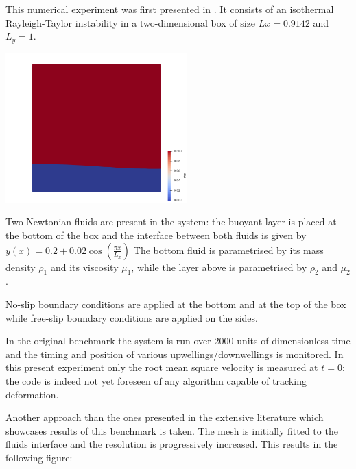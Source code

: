This numerical experiment was first presented in \cite{vkks97}.
It consists of an isothermal Rayleigh-Taylor instability in a two-dimensional box
of size $Lx=0.9142$ and $L_y=1$.

\begin{center}
\includegraphics[width=7cm]{python_codes/fieldstone_RTinstability1/images/setup}
\end{center}

Two Newtonian fluids are present in the system: the buoyant layer is placed at the bottom of 
the box and the interface between both fluids is given by 
$
y(x)=0.2+0.02\cos \left( \frac{\pi x}{L_x}  \right)
$
The bottom fluid is parametrised by its mass density $\rho_1$ and its viscosity $\mu_1$, 
while the layer above is parametrised by $\rho_2$ and $\mu_2$.

No-slip boundary conditions are applied at the bottom and at the top of the box 
while free-slip boundary conditions are applied on the sides. 

In the original benchmark the system is run over 2000 units of dimensionless time and the 
timing and position of various upwellings/downwellings is monitored. 
In this present experiment only the root mean square velocity is measured at $t=0$:
the code is indeed not yet foreseen of any algorithm capable of tracking deformation.

Another approach than the ones presented in the extensive literature which showcases 
results of this benchmark is taken. The mesh is initially fitted to the fluids
interface and the resolution is progressively increased. This results in the 
following figure:

